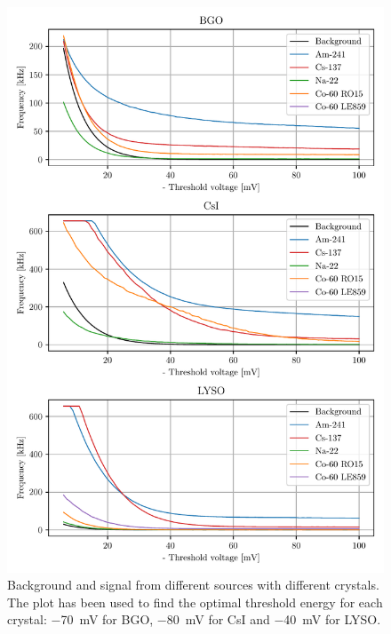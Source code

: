 \documentclass[a4paper, 11pt, table]{article}
\begin{document}
\begin{figure}[H]
    \centering
    \includegraphics[height=0.88\textheight]{figures/thresholds.pdf}
    \caption{Background and signal from different sources with different crystals. The plot has been used to find the optimal threshold energy for each crystal: \SI{-70}{mV} for BGO, \SI{-80}{mV} for CsI and \SI{-40}{mV} for LYSO.}
    \label{fig:threshold}
\end{figure}
\end{document}
